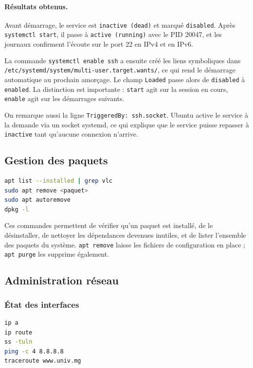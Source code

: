 \documentclass[11pt,a4paper]{article}
\begin{document}
\paragraph{R\'esultats obtenus.}
Avant d\'emarrage, le service est \texttt{inactive (dead)} et marqu\'e \texttt{disabled}. Apr\`es
\texttt{systemctl start}, il passe \`a \texttt{active (running)} avec le PID 20047, et les journaux
confirment l'\'ecoute sur le port 22 en IPv4 et en IPv6.

La commande \texttt{systemctl enable ssh} a ensuite cr\'e\'e les liens symboliques dans
\texttt{/etc/systemd/system/multi-user.target.wants/}, ce qui rend le d\'emarrage automatique au prochain
amor\c{c}age. Le champ \texttt{Loaded} passe alors de \texttt{disabled} \`a \texttt{enabled}. La distinction
est importante : \texttt{start} agit sur la session en cours, \texttt{enable} agit sur les d\'emarrages
suivants.

On remarque aussi la ligne \texttt{TriggeredBy: ssh.socket}. Ubuntu active le service \`a la demande via un
socket systemd, ce qui explique que le service puisse repasser \`a \texttt{inactive} tant qu'aucune connexion
n'arrive.

\subsection{Gestion des paquets}

\begin{lstlisting}[language=bash]
apt list --installed | grep vlc
sudo apt remove <paquet>
sudo apt autoremove
dpkg -l
\end{lstlisting}

Ces commandes permettent de v\'erifier qu'un paquet est install\'e, de le d\'esinstaller, de nettoyer les
d\'ependances devenues inutiles, et de lister l'ensemble des paquets du syst\`eme. \texttt{apt remove} laisse
les fichiers de configuration en place ; \texttt{apt purge} les supprime \'egalement.

\subsection{Administration r\'eseau}

\subsubsection{\'Etat des interfaces}

\begin{lstlisting}[language=bash]
ip a
ip route
ss -tuln
ping -c 4 8.8.8.8
traceroute www.univ.mg
\end{lstlisting}
\end{document}
